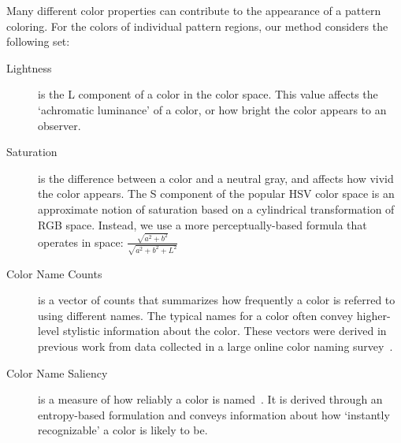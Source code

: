 Many different color properties can contribute to the appearance of a pattern coloring. For the colors of individual pattern regions, our method considers the following set:
\begin{description}
	\item[Lightness] is the L component of a color in the \lab color space. This value affects the `achromatic luminance' of a color, or how bright the color appears to an observer.
	\item[Saturation] is the difference between a color and a neutral gray, and affects how vivid the color appears. The S component of the popular HSV color space is an approximate notion of saturation based on a cylindrical transformation of RGB space. Instead, we use a more perceptually-based formula that operates in \lab space: $\frac{\sqrt{a^2+b^2}}{\sqrt{a^2+b^2+L^2}}$ ~\cite{ColorfulnessReference}
	\item[Color Name Counts] is a vector of counts that summarizes how frequently a color is referred to using different names. The typical names for a color often convey higher-level stylistic information about the color. These vectors were derived in previous work from data collected in a large online color naming survey~\cite{ColorNamingModels}.
	\item[Color Name Saliency] is a measure of how reliably a color is named~\cite{ColorNamingModels}. It is derived through an entropy-based formulation and conveys information about how `instantly recognizable' a color is likely to be.
\end{description}

